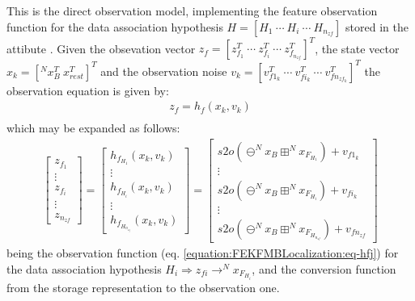 \documentclass[letterpaper,10pt,english]{sphinxmanual}
\begin{document}
\begin{fulllineitems}
\begin{fulllineitems}
\label{\detokenize{FEKFMBLocalization:MapFeature.MapFeature.hf}}
\pysigstartsignatures
{}
\pysigstopsignatures
\sphinxAtStartPar
This is the direct observation model, implementing the feature observation function for the data
association hypothesis \(H=[H_1~\cdots~H_i~\cdots~H_{n_{zf}}]\) stored in the attibute .
Given the obsevation vector \(z_f=[z_{f_1}^T~\cdots~z_{f_i}^T~\cdots~z_{f_{n_{zf}}}^T]^T\), the state vector
\(x_k=[^Nx_B^T~x_{rest}^T]^T\) and the observation noise \(v_k=[v_{f1_k}^T~\cdots~v_{fi_k}^T~\cdots~v_{fn_{zf_k}}^T]^T\)
the observation equation is given by:
\begin{equation}\label{equation:FEKFMBLocalization:eq-hf}
\begin{split}z_f=h_f(x_k,v_k) \\\end{split}
\end{equation}
\sphinxAtStartPar
which may be expanded as follows:
\begin{equation}\label{equation:FEKFMBLocalization:eq-hf-element-wise}
\begin{split}\begin{bmatrix} z_{f_1} \\ \vdots  \\ z_{f_i} \\ \vdots \\ z_{n_{zf}} \end{bmatrix} = \begin{bmatrix} h_{f_{H_1}}(x_k,v_k) \\ \vdots \\ h_{f_{H_i}}(x_k,v_k) \\ \vdots \\ h_{f_{H_{n_{z_f}}}}(x_k,v_k) \end{bmatrix}
= \begin{bmatrix} s2o(\ominus ^Nx_B \boxplus^Nx_{F_{H_1}})+ v_{f1_k}\\ \vdots \\  s2o(\ominus ^Nx_B \boxplus^Nx_{F_{H_i}})+ v_{fi_k}\\ \vdots \\ s2o(\ominus ^Nx_B \boxplus ^Nx_{F_{H_{n_{zf}}}}) + v_{fn_{zf}}\end{bmatrix}\end{split}
\end{equation}
\sphinxAtStartPar
being {\hyperref[\detokenize{FEKFMBLocalization:MapFeature.MapFeature.hfj}]{}} the observation function (eq. \eqref{equation:FEKFMBLocalization:eq-hfj}) for the data association hypothesis \(H_i \Rightarrow z_{fi} \rightarrow  ^Nx_{F_{H_i}}\), and {\hyperref[\detokenize{FEKFMBLocalization:MapFeature.MapFeature.s2o}]{}} the conversion
function from the storage representation to the observation one.


\end{fulllineitems}
\end{fulllineitems}
\end{document}
